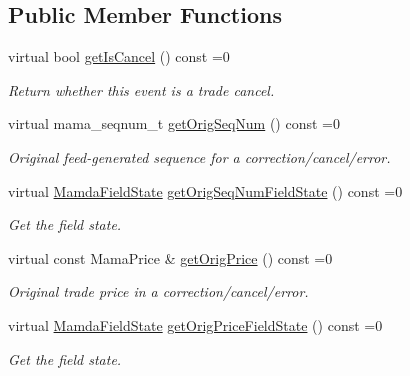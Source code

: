 \subsection*{Public Member Functions}
\begin{CompactItemize}
\item 
virtual bool \hyperlink{classWombat_1_1MamdaTradeCancelOrError_2dc051dab18a59a13febfe4edcaa34ae}{get\-Is\-Cancel} () const =0
\begin{CompactList}\small\item\em Return whether this event is a trade cancel. \item\end{CompactList}\item 
virtual mama\_\-seqnum\_\-t \hyperlink{classWombat_1_1MamdaTradeCancelOrError_b60912ebb0e47bea0b5a0f0560f9fcfa}{get\-Orig\-Seq\-Num} () const =0
\begin{CompactList}\small\item\em Original feed-generated sequence for a correction/cancel/error. \item\end{CompactList}\item 
virtual \hyperlink{namespaceWombat_93aac974f2ab713554fd12a1fa3b7d2a}{Mamda\-Field\-State} \hyperlink{classWombat_1_1MamdaTradeCancelOrError_fb7e94b42033b155bc02f70ed2756062}{get\-Orig\-Seq\-Num\-Field\-State} () const =0
\begin{CompactList}\small\item\em Get the field state. \item\end{CompactList}\item 
virtual const Mama\-Price \& \hyperlink{classWombat_1_1MamdaTradeCancelOrError_f30fe9dc7c0325555e8fa31f0865d4b4}{get\-Orig\-Price} () const =0
\begin{CompactList}\small\item\em Original trade price in a correction/cancel/error. \item\end{CompactList}\item 
virtual \hyperlink{namespaceWombat_93aac974f2ab713554fd12a1fa3b7d2a}{Mamda\-Field\-State} \hyperlink{classWombat_1_1MamdaTradeCancelOrError_8de66475d67639ac8bbececda9f73d95}{get\-Orig\-Price\-Field\-State} () const =0
\begin{CompactList}\small\item\em Get the field state. \item\end{CompactList}\item 

\end{CompactItemize}
